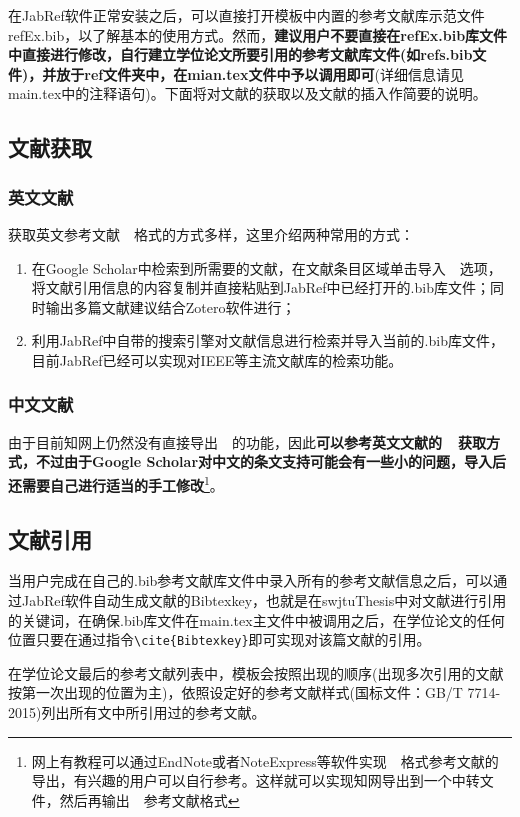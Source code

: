\par
在JabRef软件正常安装之后，可以直接打开模板中内置的参考文献库示范文件refEx.bib，以了解基本的使用方式。然而，\textbf{建议用户不要直接在refEx.bib库文件中直接进行修改，自行建立学位论文所要引用的参考文献库文件(如refs.bib文件)，并放于ref文件夹中，在mian.tex文件中予以调用即可}(详细信息请见main.tex中的注释语句)。下面将对文献的获取以及文献的插入作简要的说明。

\subsection{文献获取}
\subsubsection{英文文献}
获取英文参考文献~\BibTeX{}~格式的方式多样，这里介绍两种常用的方式：
\par
\begin{enumerate}
  \item 在Google Scholar中检索到所需要的文献，在文献条目区域单击导入~\BibTeX{}~选项，将文献引用信息的内容复制并直接粘贴到JabRef中已经打开的.bib库文件；同时输出多篇文献建议结合Zotero软件进行；
  \item 利用JabRef中自带的搜索引擎对文献信息进行检索并导入当前的.bib库文件，目前JabRef已经可以实现对IEEE等主流文献库的检索功能。
\end{enumerate}

\subsubsection{中文文献}
由于目前知网上仍然没有直接导出~\BibTeX{}~的功能，因此\textbf{可以参考英文文献的~\BibTeX{}~获取方式，不过由于Google Scholar对中文的条文支持可能会有一些小的问题，导入后还需要自己进行适当的手工修改}\footnote{网上有教程可以通过EndNote或者NoteExpress等软件实现~\BibTeX{}~格式参考文献的导出，有兴趣的用户可以自行参考。这样就可以实现知网导出到一个中转文件，然后再输出~\BibTeX{}~参考文献格式}。

\subsection{文献引用}
当用户完成在自己的.bib参考文献库文件中录入所有的参考文献信息之后，可以通过JabRef软件自动生成文献的Bibtexkey，也就是在swjtuThesis中对文献进行引用的关键词，在确保.bib库文件在main.tex主文件中被调用之后，在学位论文的任何位置只要在通过指令\verb|\cite{Bibtexkey}|即可实现对该篇文献的引用。

\par
在学位论文最后的参考文献列表中，模板会按照出现的顺序(出现多次引用的文献按第一次出现的位置为主)，依照设定好的参考文献样式(国标文件：GB/T 7714-2015)列出所有文中所引用过的参考文献。

